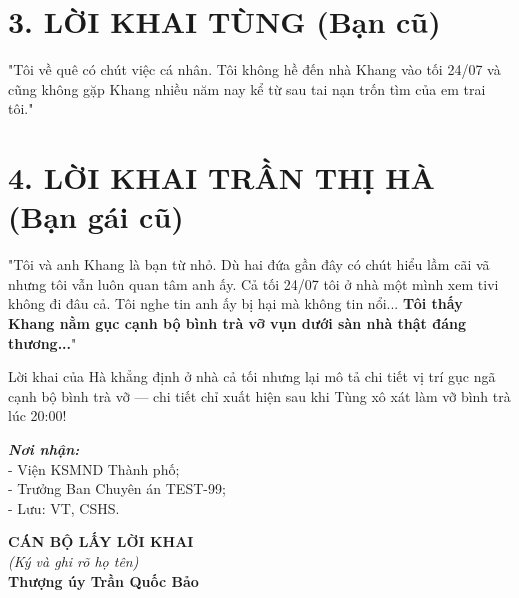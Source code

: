 \documentclass[12pt,a4paper]{article}
\begin{document}
\section*{3. LỜI KHAI TÙNG (Bạn cũ)}
\begin{tcolorbox}[colback=blue!5!white,colframe=blue!75!black]
"Tôi về quê có chút việc cá nhân. Tôi không hề đến nhà Khang vào tối 24/07 và cũng không gặp Khang nhiều năm nay kể từ sau tai nạn trốn tìm của em trai tôi."
\end{tcolorbox}

\section*{4. LỜI KHAI TRẦN THỊ HÀ (Bạn gái cũ)}
\begin{tcolorbox}[colback=red!5!white,colframe=red!75!black,title=\textbf{ĐIỂM LỜI KHAI LỠ LỜI BẤT THƯỜNG}]
"Tôi và anh Khang là bạn từ nhỏ. Dù hai đứa gần đây có chút hiểu lầm cãi vã nhưng tôi vẫn luôn quan tâm anh ấy. Cả tối 24/07 tôi ở nhà một mình xem tivi không đi đâu cả. Tôi nghe tin anh ấy bị hại mà không tin nổi... \textbf{Tôi thấy Khang nằm gục cạnh bộ bình trà vỡ vụn dưới sàn nhà thật đáng thương...}"
\end{tcolorbox}

\begin{tcolorbox}[colback=yellow!10!white,colframe=yellow!75!black,title=\textbf{GHI CHÚ ĐIỀU TRA VIÊN (ALIBI CLASH)}]
Lời khai của Hà khẳng định ở nhà cả tối nhưng lại mô tả chi tiết vị trí gục ngã cạnh bộ bình trà vỡ — chi tiết chỉ xuất hiện sau khi Tùng xô xát làm vỡ bình trà lúc 20:00!
\end{tcolorbox}

\vspace{0.8cm}

\noindent
\begin{minipage}[t]{0.45\textwidth}
    \textbf{\textit{Nơi nhận:}}\\
    \small{- Viện KSMND Thành phố;}\\
    \small{- Trưởng Ban Chuyên án TEST-99;}\\
    \small{- Lưu: VT, CSHS.}
\end{minipage}
\hfill
\begin{minipage}[t]{0.5\textwidth}
    \begin{center}
        \textbf{CÁN BỘ LẤY LỜI KHAI}\\
        \textit{(Ký và ghi rõ họ tên)}\\[1.5cm]
        \textbf{Thượng úy Trần Quốc Bảo}
    \end{center}
\end{minipage}
\end{document}
